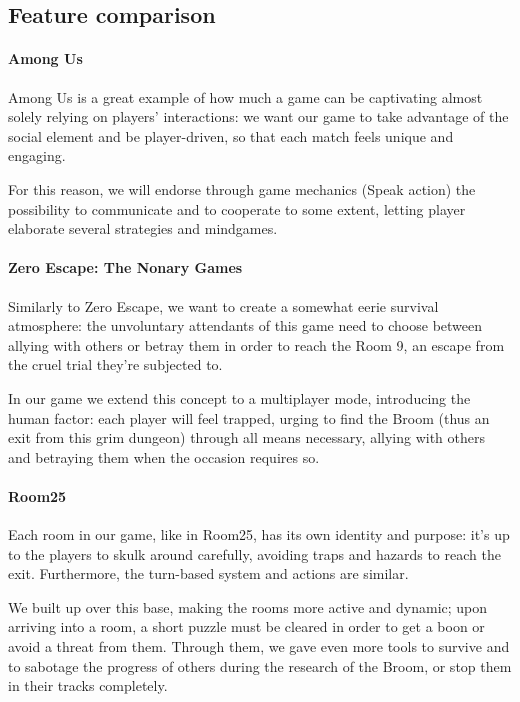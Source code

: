 \subsection{Feature comparison}

\paragraph{Among Us}
Among Us is a great example of how much a game can be captivating almost solely relying on players' interactions: we want our game to take advantage of the social element and be player-driven, so that each match feels unique and engaging.


For this reason, we will endorse through game mechanics (Speak action) the possibility to communicate and to cooperate to some extent, letting player elaborate several strategies and mindgames.

\paragraph{Zero Escape: The Nonary Games}

Similarly to Zero Escape, we want to create a somewhat eerie survival atmosphere: the unvoluntary attendants of this game need to choose between allying with others or betray them in order to reach the Room 9, an escape from the cruel trial they're subjected to.


In our game we extend this concept to a multiplayer mode, introducing the human factor: each player will feel trapped, urging to find the Broom (thus an exit from this grim dungeon) through all means necessary, allying with others and betraying them when the occasion requires so.

\paragraph{Room25}
Each room in our game, like in Room25, has its own identity and purpose: it's up to the players to skulk around carefully, avoiding traps and hazards to reach the exit. Furthermore, the turn-based system and actions are similar.


We built up over this base, making the rooms more active and dynamic; upon arriving into a room, a short puzzle must be cleared in order to get a boon or avoid a threat from them. Through them, we gave even more tools to survive and to sabotage the progress of others during the research of the Broom, or stop them in their tracks completely.

\clearpage